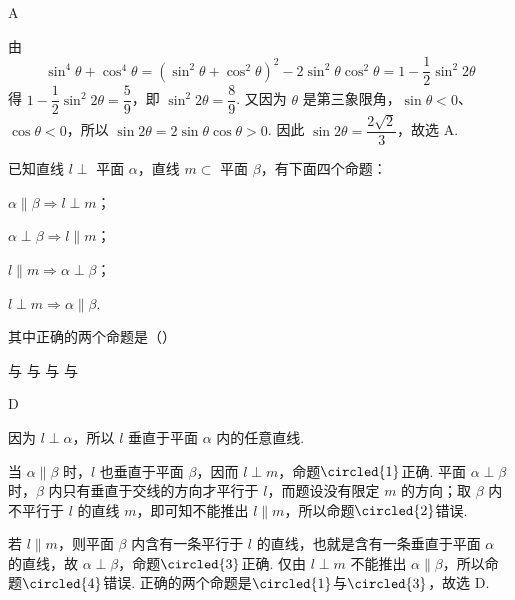 \begin{answer}
A
\end{answer}

\begin{solution}
由
\[
\sin^4\theta+\cos^4\theta
=\left(\sin^2\theta+\cos^2\theta\right)^2-2\sin^2\theta\cos^2\theta
=1-\frac12\sin^2 2\theta
\]
得 \(1-\dfrac12\sin^2 2\theta=\dfrac59\)，即 \(\sin^2 2\theta=\dfrac89\). 又因为 \(\theta\) 是第三象限角，\(\sin\theta<0\)、\(\cos\theta<0\)，所以 \(\sin2\theta=2\sin\theta\cos\theta>0\). 因此 \(\sin2\theta=\dfrac{2\sqrt2}{3}\)，故选 A.
\end{solution}

\begin{problem}
已知直线 \(l \perp\) 平面 \(\alpha\)，直线 \(m \subset\) 平面 \(\beta\)，有下面四个命题：

\begin{circlelist}
\item \(\alpha \parallel \beta \Rightarrow l \perp m\)；
\item \(\alpha \perp \beta \Rightarrow l \parallel m\)；
\item \(l \parallel m \Rightarrow \alpha \perp \beta\)；
\item \(l \perp m \Rightarrow \alpha \parallel \beta\).
\end{circlelist}

其中正确的两个命题是（\quad）

\choices
    {与}
    {与}
    {与}
    {与}
\end{problem}

\begin{answer}
D
\end{answer}

\begin{solution}
因为 \(l\perp\alpha\)，所以 \(l\) 垂直于平面 \(\alpha\) 内的任意直线.

当 \(\alpha\parallel\beta\) 时，\(l\) 也垂直于平面 \(\beta\)，因而 \(l\perp m\)，命题\(\circled{1}\)正确. 平面 \(\alpha\perp\beta\) 时，\(\beta\) 内只有垂直于交线的方向才平行于 \(l\)，而题设没有限定 \(m\) 的方向；取 \(\beta\) 内不平行于 \(l\) 的直线 \(m\)，即可知不能推出 \(l\parallel m\)，所以命题\(\circled{2}\)错误.

若 \(l\parallel m\)，则平面 \(\beta\) 内含有一条平行于 \(l\) 的直线，也就是含有一条垂直于平面 \(\alpha\) 的直线，故 \(\alpha\perp\beta\)，命题\(\circled{3}\)正确. 仅由 \(l\perp m\) 不能推出 \(\alpha\parallel\beta\)，所以命题\(\circled{4}\)错误. 正确的两个命题是\(\circled{1}\)与\(\circled{3}\)，故选 D.
\end{solution}

